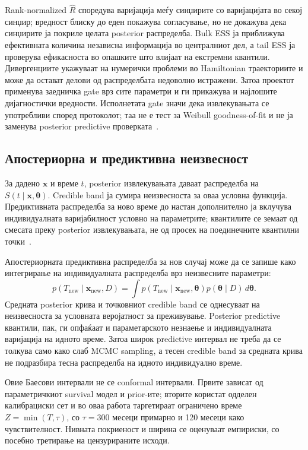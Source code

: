 \documentclass[12pt]{article}
\begin{document}
Rank-normalized $\widehat R$ споредува варијација меѓу синџирите со варијацијата
во секој синџир; вредност блиску до еден покажува согласување, но не докажува
дека синџирите ја покриле целата posterior распределба. Bulk ESS ја приближува
ефективната количина независна информација во централниот дел, а tail ESS ја
проверува ефикасноста во опашките што влијаат на екстремни квантили. Дивергенциите
укажуваат на нумерички проблеми во Hamiltonian траекториите и може да остават
делови од распределбата недоволно истражени. Затоа проектот применува заедничка
gate врз сите параметри и ги прикажува и најлошите дијагностички вредности.
Исполнетата gate значи дека извлекувањата се употребливи според протоколот;
таа не е тест за Weibull goodness-of-fit и не ја заменува posterior predictive
проверката~\cite{vehtari2021}.

\subsection{Апостериорна и предиктивна неизвесност}

За дадено $\mathbf{x}$ и време $t$, posterior извлекувањата даваат распределба
на $S(t\mid\mathbf{x},\boldsymbol{\theta})$. Credible band ја сумира
неизвесноста за оваа условна функција. Предиктивната распределба за ново време
до настан дополнително ја вклучува индивидуалната варијабилност условно на
параметрите; квантилите се земаат од смесата преку posterior извлекувањата,
не од просек на поединечните квантилни точки~\cite{gelman2013}.

Апостериорната предиктивна распределба за нов случај може да се запише како
интегрирање на индивидуалната распределба врз неизвесните параметри:
\[
p(T_{\mathrm{new}}\mid\mathbf{x}_{\mathrm{new}},D)=
\int p(T_{\mathrm{new}}\mid\mathbf{x}_{\mathrm{new}},\boldsymbol{\theta})
p(\boldsymbol{\theta}\mid D)\,d\boldsymbol{\theta}.
\]
Средната posterior крива и точковниот credible band се однесуваат на неизвесноста
за условната веројатност за преживување. Posterior predictive квантили, пак,
ги опфаќаат и параметарското незнаење и индивидуалната варијација на идното
време. Затоа широк predictive интервал не треба да се толкува само како слаб
MCMC sampling, а тесен credible band за средната крива не подразбира тесна
распределба на идното индивидуално време.

Овие Баесови интервали не се conformal интервали. Првите зависат од параметричкиот
survival модел и prior-ите; вторите користат одделен калибрациски сет и во оваа
работа таргетираат ограничено време $Z=\min(T,\tau)$, со $\tau=300$ месеци
примарно и 120 месеци како чувствителност. Нивната покриеност и ширина се
оценуваат емпириски, со посебно третирање на цензурираните исходи.
\end{document}
